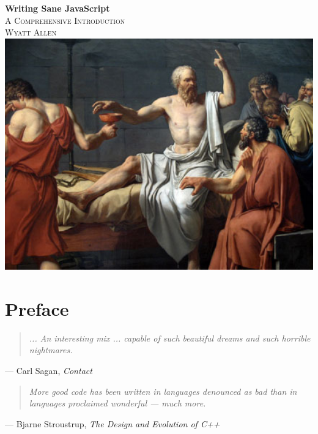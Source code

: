 \documentclass[11pt,letter]{book}
\begin{document}
    \frontmatter

    \begin{titlepage}
        \begin{center}
            { \huge \bfseries Writing Sane JavaScript}\\[0.4cm]
            \textsc{\Large A Comprehensive Introduction}\\[0.5cm]
            \textsc{Wyatt Allen}\\
            \vspace{1.2cm}
            \includegraphics[width=14cm]{socrates-hemlock}
            \vfill
        \end{center}
    \end{titlepage}
    
    \tableofcontents 
    
    \chapter{Preface}
    \begin{quote}
        \emph{
            ... An interesting mix ... capable of such beautiful dreams and such horrible 
            nightmares.
        }
    \end{quote}
    \begin{flushright}
        --- Carl Sagan, \emph{Contact}
    \end{flushright}
    \vspace{1.2cm}
	
	\begin{quote}
        \emph{
            More good code has been written in languages denounced as bad than in languages 
			proclaimed wonderful --- much more.
        }
    \end{quote}
    \begin{flushright}
        --- Bjarne Stroustrup, \emph{The Design and Evolution of C++}
    \end{flushright}
    \vspace{1.2cm}
    
\end{document}
